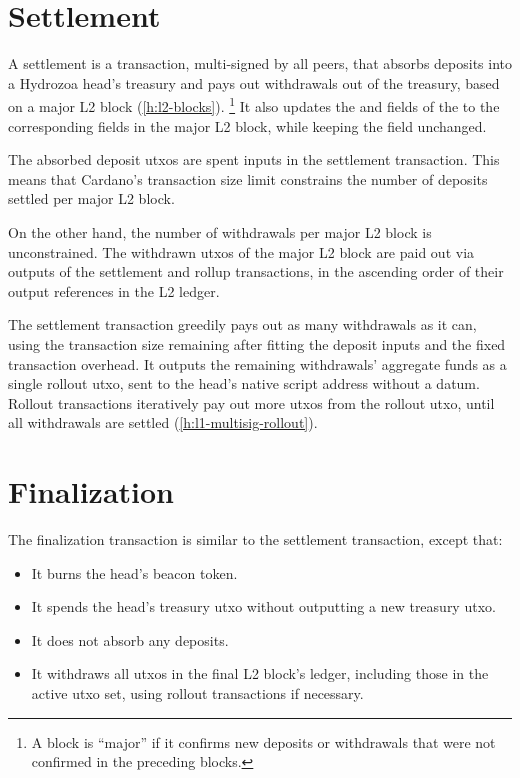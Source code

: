 \documentclass[../hydrozoa.tex]{subfiles}
\begin{document}
\section{Settlement}%
\label{h:l1-multisig-settlement}%

A settlement is a transaction, multi-signed by all peers, that absorbs deposits into a Hydrozoa head's treasury and pays out withdrawals out of the treasury, based on a major L2 block (\cref{h:l2-blocks}).%
\footnote{A block is ``major'' if it confirms new deposits or withdrawals that were not confirmed in the preceding blocks.}
It also updates the  and  fields of the  to the corresponding fields in the major L2 block, while keeping the  field unchanged.

The absorbed deposit utxos are spent inputs in the settlement transaction.
This means that Cardano's transaction size limit constrains the number of deposits settled per major L2 block.

On the other hand, the number of withdrawals per major L2 block is unconstrained.
The withdrawn utxos of the major L2 block are paid out via outputs of the settlement and rollup transactions, in the ascending order of their output references in the L2 ledger.

The settlement transaction greedily pays out as many withdrawals as it can, using the transaction size remaining after fitting the deposit inputs and the fixed transaction overhead.
It outputs the remaining withdrawals' aggregate funds as a single rollout utxo, sent to the head's native script address without a datum.
Rollout transactions iteratively pay out more utxos from the rollout utxo, until all withdrawals are settled (\cref{h:l1-multisig-rollout}).

\section{Finalization}%
\label{h:l1-multisig-finalization}%

The finalization transaction is similar to the settlement transaction, except that:
\begin{itemize}
  \item It burns the head's beacon token.
  \item It spends the head's treasury utxo without outputting a new treasury utxo.
  \item It does not absorb any deposits.
  \item It withdraws all utxos in the final L2 block's ledger, including those in the active utxo set, using rollout transactions if necessary.
\end{itemize}
\end{document}
